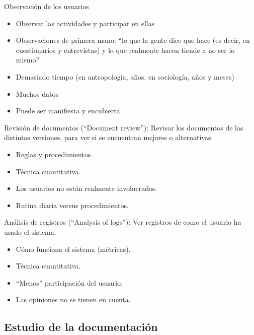 \documentclass[12pt, twoside, openright]{report} %
\begin{document}
        Observación de los usuarios

        \begin{itemize}
        
        \item
          Observar las actividades y participar en ellas
        \item
          Observaciones de primera mano: ``lo que la gente dice que hace
          (es decir, en cuestionarios y entrevistas) y lo que realmente
          hacen tiende a no ser lo mismo''
        \item
          Demasiado tiempo (en antropología, años, en sociología, años y
          meses)
        \item
          Muchos datos
        \item
          Puede ser manifiesta y encubierta
        \end{itemize}

        Revisión de documentos (``Document review''): Revisar los
        documentos de las distintas versiones, para ver si se encuentran
        mejores o alternativas.

        \begin{itemize}
        
        \item
          Reglas y procedimientos.
        \item
          Técnica cuantitativa.
        \item
          Los usuarios no están realmente involucrados.
        \item
          Rutina diaria versus procedimientos.
        \end{itemize}

        Análisis de registros (``Analysis of logs''): Ver registros de
        como el usuario ha usado el sistema.

        \begin{itemize}
        
        \item
          Cómo funciona el sistema (métricas).
        \item
          Técnica cuantitativa.
        \item
          ``Menos'' participación del usuario.
        \item
          Las opiniones no se tienen en cuenta.
        \end{itemize}

\subsection{Estudio de la documentación}
\end{document}
